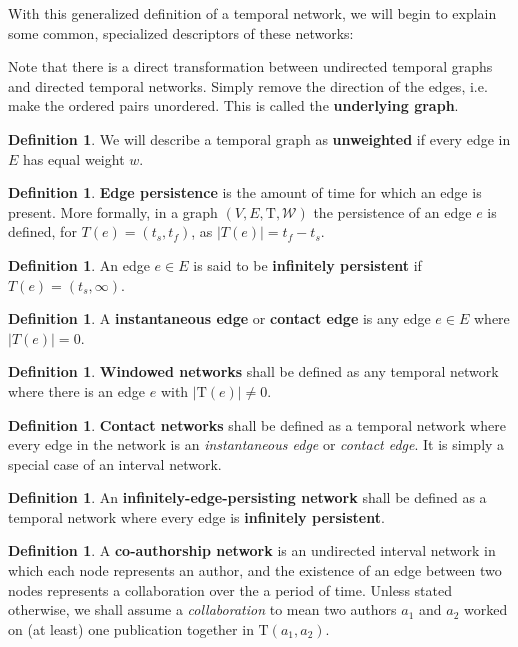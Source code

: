 \documentclass{article}
\theoremstyle{definition}
\newtheorem{defn}[thm]{Definition}
\numberwithin{thm}{subsection}
\newcommand{\W}{\mathcal{W}}
\newcommand{\T}{\text{T}}
\begin{document}
With this generalized definition of a temporal network, we will begin to explain
some common, specialized descriptors of these networks:

Note that there is a direct transformation between undirected temporal graphs and
directed temporal networks. Simply remove the direction of the edges, i.e. make
the ordered pairs unordered.  This is called the \textbf{underlying graph}.

\begin{defn}
  We will describe a temporal graph as \textbf{unweighted} if every edge in $E$
  has equal weight $w$.
\end{defn}

\begin{defn}
  \textbf{Edge persistence} is the amount of time for which an edge is present.
  More formally, in a graph $(V,E,\T,\W)$ the persistence of an edge $e$
  is defined, for $T(e) = (t_s,t_f)$, as $|T(e)| = t_f - t_s$.
\end{defn}

\begin{defn}
  An edge $e \in E$ is said to be \textbf{infinitely persistent} if
  $T(e) = (t_s, \infty)$.
\end{defn}

\begin{defn}
  A \textbf{instantaneous edge} or \textbf{contact edge} is any edge $e \in E$
  where $|T(e)| = 0$.
\end{defn}

\begin{defn}
  \textbf{Windowed networks} shall be defined as any temporal network where
  there is an edge $e$ with $|\T(e)| \neq 0$.
\end{defn}

\begin{defn}
  \textbf{Contact networks} shall be defined as a temporal network where
  every edge in the network is an \textit{instantaneous edge} or \textit{contact
  edge}. It is simply a special case of an interval network.
\end{defn}

\begin{defn}
  An \textbf{infinitely-edge-persisting network} shall be defined as a temporal
  network where every edge is \textbf{infinitely persistent}.
\end{defn}

\begin{defn}
  A \textbf{co-authorship network} is an undirected interval network in which
  each node represents an author, and the existence of an edge between two nodes
  represents a collaboration over the a period of time. Unless stated otherwise,
  we shall assume a \textit{collaboration} to mean two authors $a_1$ and $a_2$
  worked on (at least) one publication together in $\T(a_1,a_2)$.
\end{defn}
\end{document}
